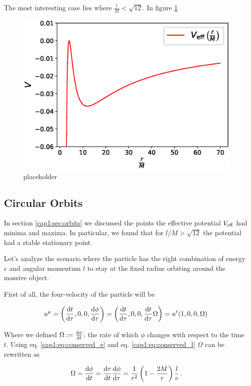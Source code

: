 The most interesting case lies where $\frac{l}{M} < \sqrt{12}$.
In figure \ref{cap1:fig:V_eff_orbite} 

\begin{figure}[h]
    \centering
    \includegraphics[width = 0.7 \textwidth]{Figures/V_eff_orbits.eps}
    \caption{placeholder}
    \label{cap1:fig:V_eff_orbite}
\end{figure}

\subsection{Circular Orbits}

In section \ref{cap1:sec:orbits} we discussed the points the effective
potential $V_{\rm eff}$ had minima and maxima.
In particular, we found that for $l / M > \sqrt{12}$ the potential had a stable
stationary point.

Let's analyze the scenario where the particle has the right combination of
energy $e$ and angular momentum $l$ to stay at the fixed radius orbiting
around the massive object.

First of all, the four-velocity of the particle will be

\begin{equation}
    u^\mu = \left(\dv{t}{\tau}, 0, 0, \dv{\phi}{\tau} \right)
    = \left(\dv{t}{\tau}, 0, 0, \dv{t}{\tau} \Omega \right)
    = u^t (1, 0, 0, \Omega) \,
    \label{cap1:eq:circular_orbit_u}
\end{equation}

Where we defined $\Omega := \dv{\phi}{t}$: the rate of which $\phi$ changes with
respect to the \Sh time $t$.
Using eq. \ref{cap1:eq:conserved_e} and eq. \ref{cap1:eq:conserved_l} $\Omega$
can be rewritten as

\begin{equation}
    \Omega = \dv{\phi}{t} = \dv{\tau}{t} \dv{\phi}{\tau} =
    \frac{1}{r^2} \left(1 - \frac{2M}{r} \right) \frac{l}{e}\, .
    \label{cap1:eq:Omega}
\end{equation}

